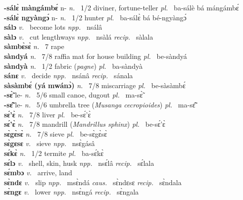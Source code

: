 {\bfseries -sálɛ̀ màngámbɛ́} n- {\itshape n.~} 1/2 diviner, fortune-teller {\itshape pl.~} ba-sálè bá mángámbɛ́    \\ 
{\bfseries -sálɛ̀ ngyàngɔ́} n- {\itshape n.~} 1/2 hunter {\itshape pl.~} ba-sálɛ̀ bá bé-ngyàngɔ́    \\ 
{\bfseries sálɔ}  {\itshape v.~} become lots   {\itshape npp.~} nsálâ  \\ 
{\bfseries sàlɔ}  {\itshape v.~} cut lengthways   {\itshape npp.~} nsàlá  {\itshape recip.~} sàlala  \\ 
{\bfseries sàmbɛ̀sɛ̀}  {\itshape n.~} 7 rape    \\ 
{\bfseries sàndyá}  {\itshape n.~} 7/8 raffia mat for house building {\itshape pl.~} be-sàndyá    \\ 
{\bfseries sàndyà}  {\itshape n.~} 1/2 fabric ({\itshape pagne}) {\itshape pl.~} ba-sàndyà    \\ 
{\bfseries sánɛ}  {\itshape v.~} decide   {\itshape npp.~} nsánâ {\itshape recip.~} sánala  \\ 
{\bfseries sàsàmbɛ́ (yá mwánɔ̀)}  {\itshape n.~} 7/8 miscarriage {\itshape pl.~} be-sàsàmbɛ́    \\ 
{\bfseries -sɛ̃̀} le- {\itshape n.~} 5/6 small canoe, dugout {\itshape pl.~} ma-sɛ̃̀    \\ 
{\bfseries -sɛ̃̂} le- {\itshape n.~} 5/6 umbrella tree ({\itshape Musanga cecropioides}) {\itshape pl.~} ma-sɛ̃̂    \\ 
{\bfseries sɛ́'ɛ̀}  {\itshape n.~} 7/8 liver {\itshape pl.~} be-sɛ́'ɛ̀    \\ 
{\bfseries sɛ́'ɛ̀}  {\itshape n.~} 7/8 mandrill ({\itshape Mandrillus sphinx}) {\itshape pl.~} be-sɛ́'ɛ̀    \\ 
{\bfseries sɛ̀gɛ̀sɛ̀}  {\itshape n.~} 7/8 sieve {\itshape pl.~} be-sɛ̀gɛ̀sɛ̀    \\ 
{\bfseries sɛ̀gɛsɛ}  {\itshape v.~} sieve   {\itshape npp.~} nsɛ̀gásâ  \\ 
{\bfseries sɛ́kɛ̀}  {\itshape n.~} 1/2 termite {\itshape pl.~} ba-sɛ́kɛ̀    \\ 
{\bfseries sɛ́lɔ}  {\itshape v.~} shell, skin, husk   {\itshape npp.~} nsɛ́lâ {\itshape recip.~} sɛ́lala  \\ 
{\bfseries sɛ́mbɔ}  {\itshape v.~} arrive, land    \\ 
{\bfseries sɛ̀ndɛ}  {\itshape v.~} slip   {\itshape npp.~} msɛ̀ndá {\itshape caus.~} sɛ̀ndɛsɛ {\itshape recip.~} sɛ̀ndala  \\ 
{\bfseries sɛ̀ngɛ}  {\itshape v.~} lower   {\itshape npp.~} nsɛ̀ngá {\itshape recip.~} sɛ̀ngala  \\ 
